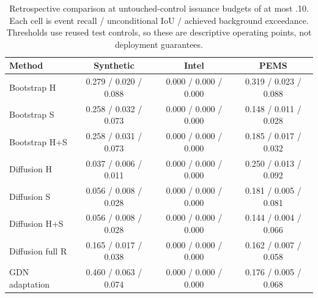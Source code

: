 \begin{table}[t]\centering\caption{Retrospective comparison at untouched-control issuance budgets of at most .10. Each cell is event recall / unconditional IoU / achieved background exceedance. Thresholds use reused test controls, so these are descriptive operating points, not deployment guarantees.}\label{tab:empirical}\small
\begin{tabular}{lccc}\toprule Method & Synthetic & Intel & PEMS\\\midrule
Bootstrap H & 0.279 / 0.020 / 0.088 & 0.000 / 0.000 / 0.000 & 0.319 / 0.023 / 0.088 \\
Bootstrap S & 0.258 / 0.032 / 0.073 & 0.000 / 0.000 / 0.000 & 0.148 / 0.011 / 0.028 \\
Bootstrap H+S & 0.258 / 0.031 / 0.073 & 0.000 / 0.000 / 0.000 & 0.185 / 0.017 / 0.032 \\
Diffusion H & 0.037 / 0.006 / 0.011 & 0.000 / 0.000 / 0.000 & 0.250 / 0.013 / 0.092 \\
Diffusion S & 0.056 / 0.008 / 0.028 & 0.000 / 0.000 / 0.000 & 0.181 / 0.005 / 0.081 \\
Diffusion H+S & 0.056 / 0.008 / 0.028 & 0.000 / 0.000 / 0.000 & 0.144 / 0.004 / 0.066 \\
Diffusion full R & 0.165 / 0.017 / 0.038 & 0.000 / 0.000 / 0.000 & 0.162 / 0.007 / 0.058 \\
GDN adaptation & 0.460 / 0.063 / 0.074 & 0.000 / 0.000 / 0.000 & 0.176 / 0.005 / 0.068 \\
\bottomrule\end{tabular}\end{table}
